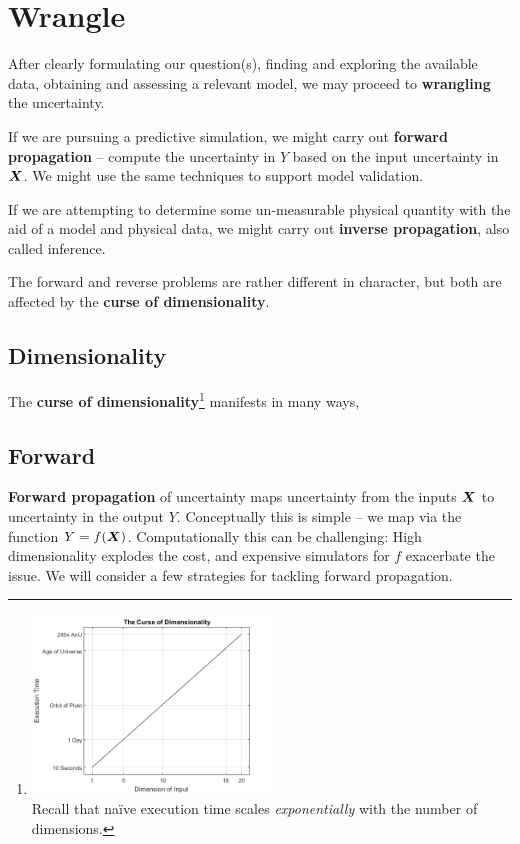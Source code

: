 \documentclass[../primer.tex]{subfiles}
\begin{document}
\chapter{Wrangle} \label{ch:wrangle}
After clearly formulating our question(s), finding and exploring the available
data, obtaining and assessing a relevant model, we may proceed to
\textbf{wrangling} the uncertainty.

If we are pursuing a predictive simulation, we might carry out \textbf{forward
  propagation} -- compute the uncertainty in $Y$ based on the input uncertainty
in $\boldsymbol{X}$. We might use the same techniques to support model validation.

If we are attempting to determine some un-measurable physical quantity with the
aid of a model and physical data, we might carry out \textbf{inverse
  propagation}, also called inference.

The forward and reverse problems are rather different in character, but both
are affected by the \textbf{curse of dimensionality}.

\section{Dimensionality}
The \textbf{curse of
  dimensionality}\footnote{\includegraphics[width=0.50\textwidth]{./images/curse_of_dimensionality}\\ Recall
  that na\"ive execution time scales \emph{exponentially} with the number of
  dimensions.} manifests in many ways,

\section{Forward}
\textbf{Forward propagation} of uncertainty maps uncertainty from the inputs
$\boldsymbol{X}$ to uncertainty in the output $Y$. Conceptually this is simple -- we map
via the function $Y = f(\boldsymbol{X})$. Computationally this can be challenging: High
dimensionality explodes the cost, and expensive simulators for $f$ exacerbate
the issue. We will consider a few strategies for tackling forward propagation.
\end{document}
